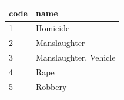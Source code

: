 \documentclass[]{article}
\begin{document}
\begin{center}
\begin{minipage}[t]{0.49\textwidth}
  \end{minipage}
  \begin{minipage}[t]{0.49\textwidth}
\begin{longtable}[]{@{}ll@{}}
  \toprule
  \begin{minipage}[b]{0.08\columnwidth}\raggedright\strut
  code\strut
\end{minipage} &   \begin{minipage}[b]{0.8\columnwidth}\raggedright\strut
  name\strut
\end{minipage}\tabularnewline
\midrule
\endhead
  \begin{minipage}[t]{0.08\columnwidth}\raggedright\strut
  1\strut
\end{minipage} &   \begin{minipage}[t]{0.8\columnwidth}\raggedright\strut
  Homicide             \strut
\end{minipage}\tabularnewline
  \begin{minipage}[t]{0.08\columnwidth}\raggedright\strut
  2\strut
\end{minipage} &   \begin{minipage}[t]{0.8\columnwidth}\raggedright\strut
  Manslaughter         \strut
\end{minipage}\tabularnewline
  \begin{minipage}[t]{0.08\columnwidth}\raggedright\strut
  3\strut
\end{minipage} &   \begin{minipage}[t]{0.8\columnwidth}\raggedright\strut
  Manslaughter, Vehicle\strut
\end{minipage}\tabularnewline
  \begin{minipage}[t]{0.08\columnwidth}\raggedright\strut
  4\strut
\end{minipage} &   \begin{minipage}[t]{0.8\columnwidth}\raggedright\strut
  Rape                 \strut
\end{minipage}\tabularnewline
  \begin{minipage}[t]{0.08\columnwidth}\raggedright\strut
  5\strut
\end{minipage} &   \begin{minipage}[t]{0.8\columnwidth}\raggedright\strut
  Robbery              \strut
\end{minipage}\tabularnewline
  \bottomrule
\end{longtable}
  \end{minipage}
\end{center}
\end{document}
